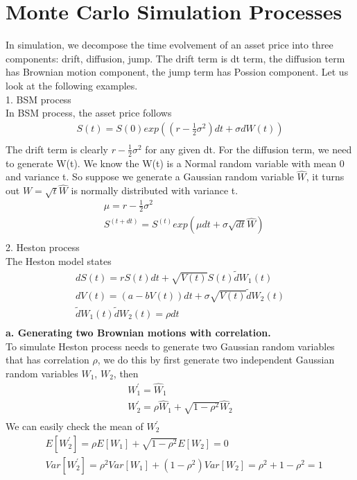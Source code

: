 \documentclass[a4paper]{article}
\begin{document}
\section{Monte Carlo Simulation Processes}
In simulation, we decompose the time evolvement of an asset price into three components: drift, diffusion, jump. The
drift term is dt term, the diffusion term has Brownian motion component, the jump term has Possion component. Let us look at the following examples. \\ 
1. BSM process\\
In BSM process, the asset price follows
\begin{align*}
	S(t) = S(0)exp((r - \frac{1}{2} \sigma^2 ) dt + \sigma dW(t)) \\
\end{align*}
The drift term is clearly $r - \frac{1}{2} \sigma^2$ for any given dt.  For the diffusion term, we need to generate W(t).
We know the W(t) is a Normal random variable with mean 0 and variance t. So suppose we generate a Gaussian random variable $\hat W$, it turns out $W = \sqrt{t} \hat W$ is normally distributed with variance t. 
\begin{align*}
	& \mu = r - \frac{1}{2} \sigma^2\\
	& S^{(t + dt)} = S^{(t)}exp(\mu dt + \sigma \sqrt{dt} \hat W) \\
\end{align*}
2. Heston process\\
The Heston model states
\begin{align*}
        dS(t) = rS(t)dt + \sqrt{V(t)} S(t) \tilde dW_1(t) \\
        dV(t) = (a -bV(t))dt + \sigma \sqrt{V(t)} \tilde dW_2(t) \\
        \tilde dW_1(t) \tilde dW_2(t) = \rho dt \\
\end{align*}
{\bf a. Generating two Brownian motions with correlation. }\\
To simulate Heston process needs to generate two Gaussian random variables that has correlation $\rho$, we do this by first generate two independent Gaussian random variables $W_1$, $W_2$, then
\begin{align*}
	W_1^{'} = \hat W_1 \\
	W_2^{'} = \rho \hat W_1 + \sqrt{1 - \rho^2} \hat W_2 \\
\end{align*}
We can easily check the mean of $W_2^{'}$
\begin{align*}
	&E[W_2^{'}] = \rho E[W_1] + \sqrt{1 - \rho^2} E[W_2] = 0\\
	&Var[W_2^{'}] = \rho^2 Var[W_1] + (1 - \rho^2) Var[W_2] = \rho^2 + 1 - \rho^2 = 1 \\
\end{align*}
\end{document}
